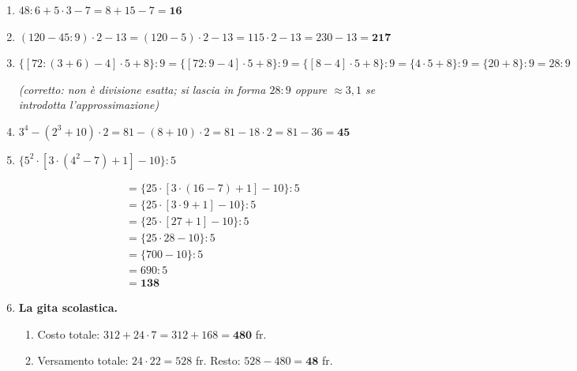 \begin{enumerate}[label=\textbf{\arabic*.}, leftmargin=2em, itemsep=0.8ex]

      \item $48 : 6 + 5 \cdot 3 - 7 = 8 + 15 - 7 = \mathbf{16}$

      \item $(120 - 45 : 9) \cdot 2 - 13
                  = (120 - 5) \cdot 2 - 13
                  = 115 \cdot 2 - 13
                  = 230 - 13
                  = \mathbf{217}$

      \item $\{[72 : (3 + 6) - 4] \cdot 5 + 8\} : 9
                  = \{[72 : 9 - 4] \cdot 5 + 8\} : 9
                  = \{[8 - 4] \cdot 5 + 8\} : 9
                  = \{4 \cdot 5 + 8\} : 9
                  = \{20 + 8\} : 9
                  = 28 : 9$

            \quad\textit{(corretto: non è divisione esatta;
                  si lascia in forma $28 : 9$ oppure $\approx 3{,}1$
                  se introdotta l'approssimazione)}

      \item $3^{4} - (2^{3} + 10) \cdot 2
                  = 81 - (8 + 10) \cdot 2
                  = 81 - 18 \cdot 2
                  = 81 - 36
                  = \mathbf{45}$

      \item $\{5^{2} \cdot [3 \cdot (4^{2} - 7) + 1] - 10\} : 5$

            \begin{align*}
                   & = \{25 \cdot [3 \cdot (16 - 7) + 1] - 10\} : 5 \\
                   & = \{25 \cdot [3 \cdot 9 + 1] - 10\} : 5        \\
                   & = \{25 \cdot [27 + 1] - 10\} : 5               \\
                   & = \{25 \cdot 28 - 10\} : 5                     \\
                   & = \{700 - 10\} : 5                             \\
                   & = 690 : 5                                      \\
                   & = \mathbf{138}
            \end{align*}

      \item \textbf{La gita scolastica.}

            \begin{enumerate}[label=\alph*), leftmargin=1.5em]
                  \item Costo totale:
                        $312 + 24 \cdot 7 = 312 + 168 = \mathbf{480}$ fr.
                  \item Versamento totale: $24 \cdot 22 = 528$ fr.
                        Resto: $528 - 480 = \mathbf{48}$ fr.
            \end{enumerate}


\end{enumerate}
